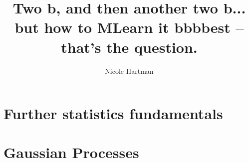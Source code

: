 \documentclass{report}
\begin{document}
\title{Two b, and then another two b... but how to MLearn it bbbbest -- that's the question.}
\author{Nicole Hartman}
 
\beforepreface




\afterpreface













\def\kvv{$\kappa_{2V}$}
\def\kv{$\kappa_V$}
 








\appendix




\chapter{Further statistics fundamentals}
\chapter{Gaussian Processes}







\end{document}
